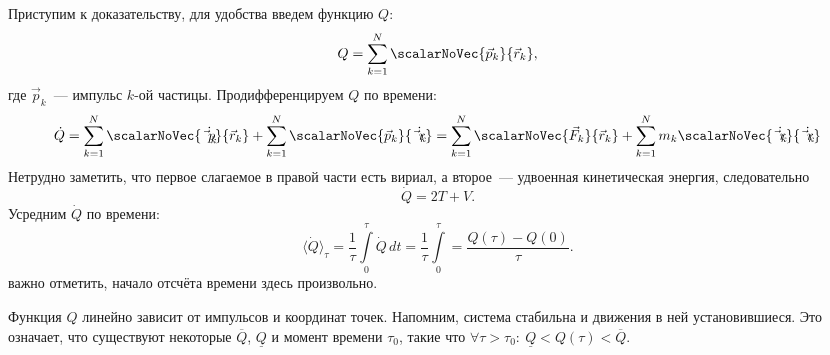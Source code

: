 Приступим к доказательству, 
для удобства введем функцию $Q$:
\begin{equation*}
    Q = \sum_{k=1}^N \scalarNoVec{\vec p_k}{\vec r_k},
\end{equation*}
где $\vec p_k$~--- импульс $k$-ой частицы. Продифференцируем $Q$ по времени:
\begin{equation*}
    \dot Q
    = \sum_{k=1}^N \scalarNoVec{\dot{\vec p_k}}{\vec r_k} 
    + \sum_{k=1}^N \scalarNoVec{\vec p_k}{\dot{\vec r_k}} 
    = \sum_{k=1}^N \scalarNoVec{\vec F_k}{\vec r_k} 
    + \sum_{k=1}^N m_k \scalarNoVec{\dot{\vec r_k}}{\dot{\vec r_k}}
\end{equation*}
Нетрудно заметить, что первое слагаемое в правой части есть вириал, а второе~--- удвоенная кинетическая энергия, следовательно
\begin{equation}
    \dot{Q} = 2T + V.
    \label{eq:virial-2tv}
\end{equation}
Усредним $\dot{Q}$ по времени:
\begin{equation}
    \langle \dot{Q} \rangle_\tau 
    = \frac{1}{\tau} \int\limits_0^\tau \dot{Q} \,d t 
    = \frac{1}{\tau} \int\limits_0^\tau 
    = \frac{Q(\tau) - Q(0)}{\tau}.
\label{eq:virial-avg-g}
\end{equation} 
важно отметить, начало отсчёта времени здесь произвольно.

Функция $Q$ линейно зависит от импульсов и координат точек. Напомним, система стабильна и движения в ней установившиеся. Это означает, что существуют некоторые $\overline Q$, $\underline Q$ и  момент времени $\tau_0$, такие что $\forall \tau > \tau_0:~\underline Q < Q(\tau) < \overline Q$.

